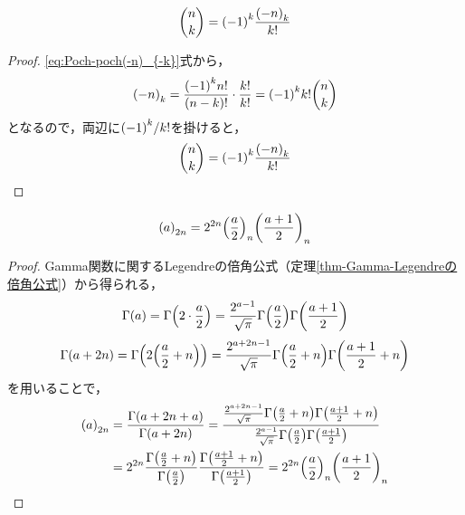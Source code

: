 \documentclass[a4paper,draft]{ltjsarticle}
\begin{document}
\begin{prop}
    \begin{equation}
        \binom{n}{k}=\pare{-1}^k\frac{\poch{-n}{k}}{k!}
    \end{equation}
    \begin{proof}
        \eqref{eq:Poch-poch(-n)_{-k}}式から，
        \begin{equation}
            \poch{-n}{k}=\frac{\pare{-1}^k n!}{\pare{n-k}!}\cdot \frac{k!}{k!}=\pare{-1}^k k!\binom{n}{k}
        \end{equation}
        となるので，両辺に$\pare{-1}^k/k!$を掛けると，
        \begin{equation}
            \binom{n}{k}=\pare{-1}^k\frac{\poch{-n}{k}}{k!}
        \end{equation}
    \end{proof}
\end{prop}

\begin{prop}
    \begin{equation}
        \poch{a}{2n}=2^{2n}\poch{\frac{a}{2}}{n}\poch{\frac{a+1}{2}}{n}
    \end{equation}
    \begin{proof}
        Gamma関数に関するLegendreの倍角公式（定理\ref{thm-Gamma-Legendreの倍角公式}）から得られる，
        \begin{equation}
            \fun{\Gamma}{a}=\fun{\Gamma}{2\cdot\frac{a}{2}}=\frac{2^{a-1}}{\sqrt{\pi}}\fun{\Gamma}{\frac{a}{2}}\fun{\Gamma}{\frac{a+1}{2}}
        \end{equation}
        \begin{equation}
            \fun{\Gamma}{a+2n}=\fun{\Gamma}{2\pare{\frac{a}{2}+n}}=\frac{2^{a+2n-1}}{\sqrt{\pi}}\fun{\Gamma}{\frac{a}{2}+n}\fun{\Gamma}{\frac{a+1}{2}+n}
        \end{equation}
        を用いることで，
        \begin{align}
            \poch{a}{2n}&=\Poch{a+2n}{a}=\frac{\frac{2^{a+2n-1}}{\sqrt{\pi}}\fun{\Gamma}{\frac{a}{2}+n}\fun{\Gamma}{\frac{a+1}{2}+n}}{\frac{2^{a-1}}{\sqrt{\pi}}\fun{\Gamma}{\frac{a}{2}}\fun{\Gamma}{\frac{a+1}{2}}}
            \\
            &=2^{2n}\Poch{\frac{a}{2}}{n}\Poch{\frac{a+1}{2}}{n}=2^{2n}\poch{\frac{a}{2}}{n}\poch{\frac{a+1}{2}}{n}
        \end{align}
    \end{proof}
\end{prop}
\end{document}
